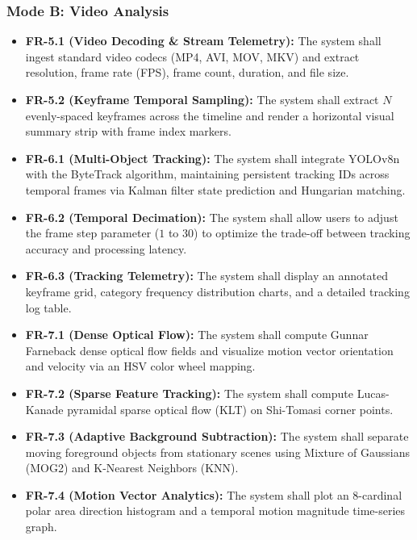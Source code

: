 \subsubsection{Mode B: Video Analysis}
\begin{itemize}
    \item \textbf{FR-5.1 (Video Decoding \& Stream Telemetry):} The system shall ingest standard video codecs (MP4, AVI, MOV, MKV) and extract resolution, frame rate (FPS), frame count, duration, and file size.
    \item \textbf{FR-5.2 (Keyframe Temporal Sampling):} The system shall extract $N$ evenly-spaced keyframes across the timeline and render a horizontal visual summary strip with frame index markers.
    \item \textbf{FR-6.1 (Multi-Object Tracking):} The system shall integrate YOLOv8n with the ByteTrack algorithm, maintaining persistent tracking IDs across temporal frames via Kalman filter state prediction and Hungarian matching.
    \item \textbf{FR-6.2 (Temporal Decimation):} The system shall allow users to adjust the frame step parameter ($1$ to $30$) to optimize the trade-off between tracking accuracy and processing latency.
    \item \textbf{FR-6.3 (Tracking Telemetry):} The system shall display an annotated keyframe grid, category frequency distribution charts, and a detailed tracking log table.
    \item \textbf{FR-7.1 (Dense Optical Flow):} The system shall compute Gunnar Farneback dense optical flow fields and visualize motion vector orientation and velocity via an HSV color wheel mapping.
    \item \textbf{FR-7.2 (Sparse Feature Tracking):} The system shall compute Lucas-Kanade pyramidal sparse optical flow (KLT) on Shi-Tomasi corner points.
    \item \textbf{FR-7.3 (Adaptive Background Subtraction):} The system shall separate moving foreground objects from stationary scenes using Mixture of Gaussians (MOG2) and K-Nearest Neighbors (KNN).
    \item \textbf{FR-7.4 (Motion Vector Analytics):} The system shall plot an 8-cardinal polar area direction histogram and a temporal motion magnitude time-series graph.
\end{itemize}

